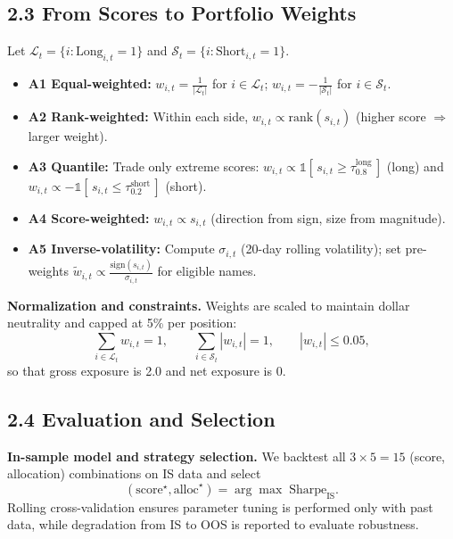 \documentclass[11pt,a4paper]{article}
\begin{document}
    \subsection*{2.3 From Scores to Portfolio Weights}

    Let $\mathcal{L}_t=\{i:\text{Long}_{i,t}=1\}$ and $\mathcal{S}_t=\{i:\text{Short}_{i,t}=1\}$.

    \begin{itemize}
        \setlength\itemsep{2pt}
        \item \textbf{A1 Equal-weighted:}
        $w_{i,t}= \frac{1}{|\mathcal{L}_t|}$ for $i\in\mathcal{L}_t$;
        $w_{i,t}= -\frac{1}{|\mathcal{S}_t|}$ for $i\in\mathcal{S}_t$.
        \item \textbf{A2 Rank-weighted:}
        Within each side, $w_{i,t}\propto \mathrm{rank}(s_{i,t})$ (higher score $\Rightarrow$ larger weight).
        \item \textbf{A3 Quantile:}
        Trade only extreme scores:
        $w_{i,t}\propto \mathbb{1}[\,s_{i,t}\ge \tau^{\text{long}}_{0.8}\,]$ (long)
        and
        $w_{i,t}\propto -\mathbb{1}[\,s_{i,t}\le \tau^{\text{short}}_{0.2}\,]$ (short).
        \item \textbf{A4 Score-weighted:}
        $w_{i,t}\propto s_{i,t}$ (direction from sign, size from magnitude).
        \item \textbf{A5 Inverse-volatility:}
        Compute $\sigma_{i,t}$ (20-day rolling volatility); set pre-weights $\tilde w_{i,t}\propto \frac{\mathrm{sign}(s_{i,t})}{\sigma_{i,t}}$ for eligible names.
    \end{itemize}

    \textbf{Normalization and constraints.}
    Weights are scaled to maintain dollar neutrality and capped at 5\% per position:
    \[
        \sum_{i\in\mathcal{L}_t} w_{i,t}=1,\qquad \sum_{i\in\mathcal{S}_t} |w_{i,t}|=1,\qquad |w_{i,t}|\le 0.05,
    \]
    so that gross exposure is 2.0 and net exposure is 0.

    \subsection*{2.4 Evaluation and Selection}

    \textbf{In-sample model and strategy selection.}
    We backtest all $3\times 5=15$ (score, allocation) combinations on IS data and select
    \[
        (\mathrm{score}^\star,\mathrm{alloc}^\star)=\arg\max \;\mathrm{Sharpe}_{\mathrm{IS}}.
    \]
    Rolling cross-validation ensures parameter tuning is performed only with past data, while degradation from IS to OOS is reported to evaluate robustness.
\end{document}
